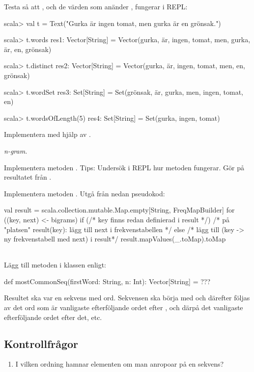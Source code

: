 {Testa så att , och de värden som anänder , fungerar i REPL:
\begin{REPL}
scala> val t = Text("Gurka är ingen tomat, men gurka är en grönsak.")

scala> t.words
res1: Vector[String] = 
  Vector(gurka, är, ingen, tomat, men, gurka, är, en, grönsak)

scala> t.distinct
res2: Vector[String] = 
  Vector(gurka, är, ingen, tomat, men, en, grönsak)

scala> t.wordSet
res3: Set[String] = Set(grönsak, är, gurka, men, ingen, tomat, en)

scala> t.wordsOfLength(5)
res4: Set[String] = Set(gurka, ingen, tomat)

\end{REPL}

\Task Implementera  med hjälp av .


\Task \emph{n-gram.} 

\Subtask Implementera metoden . Tips: Undersök i REPL hur metoden  fungerar. Gör  på resultatet från . 

\Subtask Implementera metoden . Utgå från nedan pseudokod: 
\begin{Code}
val result = scala.collection.mutable.Map.empty[String, FreqMapBuilder]
for ((key, next) <- bigrams) { 
  if (/* key finns redan definierad i result */)
    /* på "platsen" result(key): lägg till next i frekvenstabellen */
  else 
    /* lägg till (key -> ny frekvenstabell med next) i result*/ 
}
result.mapValues(_.toMap).toMap
\end{Code}
\Subtask {}\\ Lägg till metoden  i klassen  enligt: 
\begin{Code}
def mostCommonSeq(firstWord: String, n: Int): Vector[String] = ???
\end{Code}
Resultet ska var en sekvens med  ord. Sekvensen ska börja med  och därefter följas av det ord som är vanligaste efterföljande ordet efter , och därpå det vanligaste efterföljande ordet efter det, etc.


\subsection{Kontrollfrågor}

\begin{enumerate}
\item I vilken ordning hamnar elementen om man anropoar  på en sekvens?


\end{enumerate}}
